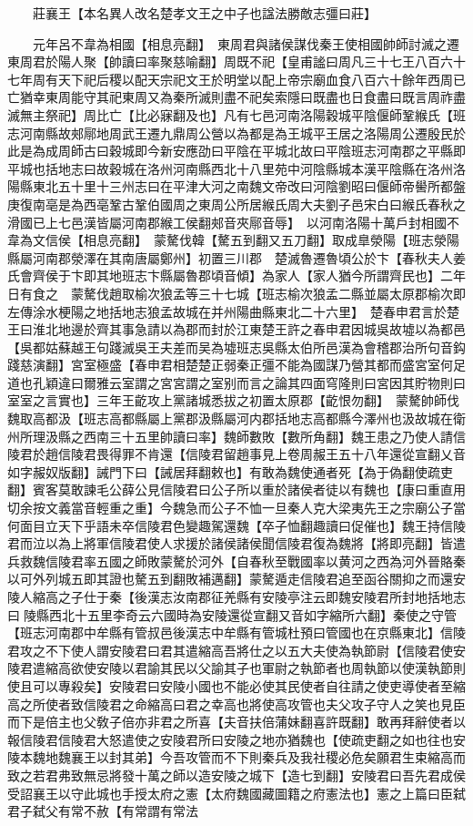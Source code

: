 　　莊襄王【本名異人改名楚孝文王之中子也諡法勝敵志彊曰莊】

　　元年呂不韋為相國【相息亮翻】　東周君與諸侯謀伐秦王使相國帥師討滅之遷東周君於陽人聚【帥讀曰率聚慈喻翻】周既不祀【皇甫謐曰周凡三十七王八百六十七年周有天下祀后稷以配天宗祀文王於明堂以配上帝宗廟血食八百六十餘年西周已亡猶幸東周能守其祀東周又為秦所滅則盡不祀矣索隱曰既盡也日食盡曰既言周祚盡滅無主祭祀】周比亡【比必寐翻及也】凡有七邑河南洛陽穀城平陰偃師鞏緱氏【班志河南縣故郟鄏地周武王遷九鼎周公營以為都是為王城平王居之洛陽周公遷殷民於此是為成周師古曰穀城即今新安應劭曰平陰在平城北故曰平陰班志河南郡之平縣即平城也括地志曰故穀城在洛州河南縣西北十八里苑中河陰縣城本漢平陰縣在洛州洛陽縣東北五十里十三州志曰在平津大河之南魏文帝改曰河陰劉昭曰偃師帝嚳所都盤庚復南亳是為西亳鞏古鞏伯國周之東周公所居緱氏周大夫劉子邑宋白曰緱氏春秋之滑國已上七邑漢皆屬河南郡緱工侯翻郟音夾鄏音辱】　以河南洛陽十萬戶封相國不韋為文信侯【相息亮翻】　蒙驁伐韓【驁五到翻又五刀翻】取成臯滎陽【班志滎陽縣屬河南郡滎澤在其南唐屬鄭州】初置三川郡　楚滅魯遷魯頃公於卞【春秋夫人姜氏會齊侯于卞即其地班志卞縣屬魯郡頃音傾】為家人【家人猶今所謂齊民也】二年日有食之　蒙驁伐趙取榆次狼孟等三十七城【班志榆次狼孟二縣並屬太原郡榆次即左傳涂水梗陽之地括地志狼孟故城在并州陽曲縣東北二十六里】　楚春申君言於楚王曰淮北地邊於齊其事急請以為郡而封於江東楚王許之春申君因城吳故墟以為都邑【吳都姑蘇越王句踐滅吳王夫差而吴為墟班志吳縣太伯所邑漢為會稽郡治所句音鈎踐慈演翻】宮室極盛【春申君相楚楚正弱秦正彊不能為國謀乃營其都而盛宮室何足道也孔穎違曰爾雅云室謂之宮宮謂之室别而言之論其四面穹隆則曰宮因其貯物則曰室室之言實也】三年王齕攻上黨諸城悉拔之初置太原郡【齕恨勿翻】　蒙驁帥師伐魏取高都汲【班志高都縣屬上黨郡汲縣屬河内郡括地志高都縣今澤州也汲故城在衛州所理汲縣之西南三十五里帥讀曰率】魏師數敗【數所角翻】魏王患之乃使人請信陵君於趙信陵君畏得罪不肯還【信陵君留趙事見上卷周赧王五十八年還從宣翻乂音如字赧奴版翻】誡門下曰【誡居拜翻敕也】有敢為魏使通者死【為于偽翻使疏吏翻】賓客莫敢諫毛公薛公見信陵君曰公子所以重於諸侯者徒以有魏也【康曰重直用切余按文義當音輕重之重】今魏急而公子不恤一旦秦人克大梁夷先王之宗廟公子當何面目立天下乎語未卒信陵君色變趣駕還魏【卒子恤翻趣讀曰促催也】魏王持信陵君而泣以為上將軍信陵君使人求援於諸侯諸侯聞信陵君復為魏將【將即亮翻】皆遣兵救魏信陵君率五國之師敗蒙驁於河外【自春秋至戰國率以黄河之西為河外晉賂秦以可外列城五即其證也驁五到翻敗補邁翻】蒙驁遁走信陵君追至函谷關抑之而還安陵人縮高之子仕于秦【後漢志汝南郡征羌縣有安陵亭注云即魏安陵君所封地括地志曰陵縣西北十五里李奇云六國時為安陵還從宣翻又音如字縮所六翻】秦使之守管【班志河南郡中牟縣有管叔邑後漢志中牟縣有管城杜預曰管國也在京縣東北】信陵君攻之不下使人謂安陵君曰君其遣縮高吾將仕之以五大夫使為執節尉【信陵君使安陵君遣縮高欲使安陵以君諭其民以父諭其子也軍尉之執節者也周執節以使漢執節則使且可以專殺矣】安陵君曰安陵小國也不能必使其民使者自往請之使吏導使者至縮高之所使者致信陵君之命縮高曰君之幸高也將使高攻管也夫父攻子守人之笑也見臣而下是倍主也父敎子倍亦非君之所喜【夫音扶倍蒲妹翻喜許既翻】敢再拜辭使者以報信陵君信陵君大怒遣使之安陵君所曰安陵之地亦猶魏也【使疏吏翻之如也往也安陵本魏地魏襄王以封其弟】今吾攻管而不下則秦兵及我社稷必危矣願君生束縮高而致之若君弗致無忌將發十萬之師以造安陵之城下【造七到翻】安陵君曰吾先君成侯受詔襄王以守此城也手授太府之憲【太府魏國藏圖籍之府憲法也】憲之上篇曰臣弑君子弑父有常不赦【有常謂有常法